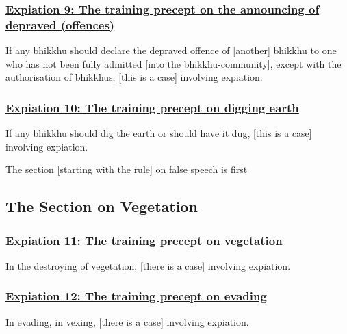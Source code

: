 \subsubsection*{\hyperref[pac9]{Expiation 9: The training precept on the announcing of depraved (offences)}}
\label{exp9}

If any bhikkhu should declare the depraved offence of [another] bhikkhu to one who has not been fully admitted [into the bhikkhu-community], except with the authorisation of bhikkhus, [this is a case] involving expiation.



\subsubsection*{\hyperref[pac10]{Expiation 10: The training precept on digging earth}}
\label{exp10}
If any bhikkhu should dig the earth or should have it dug, [this is a case] involving expiation.

\begin{center}
	The section [starting with the rule] on false speech is first
\end{center}



\setsubsecheadstyle{\subsectionFmt}
\subsection{The Section on Vegetation}
\label{exp-vagga2}

\subsubsection*{\hyperref[pac11]{Expiation 11: The training precept on vegetation}}
\label{exp11}
In the destroying of vegetation, [there is a case] involving expiation.



\subsubsection*{\hyperref[pac12]{Expiation 12: The training precept on evading}}
\label{exp12}
In evading, in vexing, [there is a case] involving expiation.



